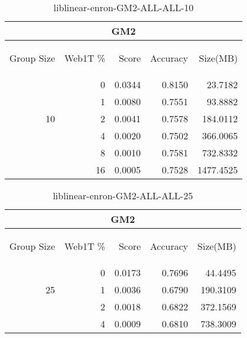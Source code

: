 \begin{center}
\begin{table}[htbp]
\begin{tabular}{ | r | r | r | r | r |}
\hline
\multicolumn{5}{|c|}{GM2}\\
\hline
\begin{sideways}Group Size\end{sideways} & \begin{sideways}Web1T \%\end{sideways} & \begin{sideways}Score\end{sideways} & \begin{sideways}Accuracy\end{sideways} & \begin{sideways}Size(MB)\end{sideways}\\
\hline
\multirow{5}{*}{10}
 & 0 & 0.0344 & 0.8150 & 23.7182\\ \cline{2-5}
 & 1 & 0.0080 & 0.7551 & 93.8882\\ \cline{2-5}
 & 2 & 0.0041 & 0.7578 & 184.0112\\ \cline{2-5}
 & 4 & 0.0020 & 0.7502 & 366.0065\\ \cline{2-5}
 & 8 & 0.0010 & 0.7581 & 732.8332\\ \cline{2-5}
 & 16 & 0.0005 & 0.7528 & 1477.4525\\ \cline{2-5}
\hline
\end{tabular}
\caption{liblinear-enron-GM2-ALL-ALL-10}
\label{table:liblinear-enron-GM2-ALL-ALL-10}
\end{table}
\end{center}

\begin{center}
\begin{table}[htbp]
\begin{tabular}{ | r | r | r | r | r |}
\hline
\multicolumn{5}{|c|}{GM2}\\
\hline
\begin{sideways}Group Size\end{sideways} & \begin{sideways}Web1T \%\end{sideways} & \begin{sideways}Score\end{sideways} & \begin{sideways}Accuracy\end{sideways} & \begin{sideways}Size(MB)\end{sideways}\\
\hline
\multirow{3}{*}{25}
 & 0 & 0.0173 & 0.7696 & 44.4495\\ \cline{2-5}
 & 1 & 0.0036 & 0.6790 & 190.3109\\ \cline{2-5}
 & 2 & 0.0018 & 0.6822 & 372.1569\\ \cline{2-5}
 & 4 & 0.0009 & 0.6810 & 738.3009\\ \cline{2-5}
\hline
\end{tabular}
\caption{liblinear-enron-GM2-ALL-ALL-25}
\label{table:liblinear-enron-GM2-ALL-ALL-25}
\end{table}
\end{center}

